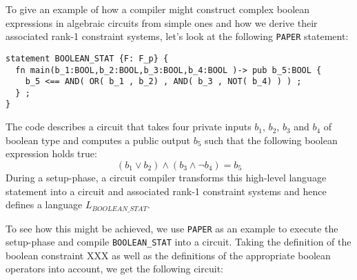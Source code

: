 \begin{example} To give an example of how a compiler might construct complex boolean expressions in algebraic circuits from simple ones and how we derive their associated rank-1 constraint systems, let's look at the following \texttt{PAPER} statement:
\begin{lstlisting}
statement BOOLEAN_STAT {F: F_p} {
  fn main(b_1:BOOL,b_2:BOOL,b_3:BOOL,b_4:BOOL )-> pub b_5:BOOL {
    b_5 <== AND( OR( b_1 , b_2) , AND( b_3 , NOT( b_4) ) ) ;
  } ;
}
\end{lstlisting}
The code describes a circuit that takes four private inputs $b_1$, $b_2$, $b_3$ and $b_4$ of boolean type and computes a public output $b_5$ such that the following boolean expression holds true:
$$
\left( b_1 \vee b_2 \right) \wedge (b_3 \wedge \lnot b_4) = b_5
$$
During a setup-phase, a circuit compiler transforms this high-level language statement into a circuit and associated rank-1 constraint systems and hence defines a  language $L_{BOOLEAN\_STAT}$. 

To see how this might be achieved, we use \texttt{PAPER} as an example to execute the setup-phase and compile \texttt{BOOLEAN\_STAT} into a circuit. Taking the definition of the boolean constraint XXX as well as the definitions of the appropriate boolean operators into account, we get the following circuit:
\begin{center}
\end{center}
\end{example}
